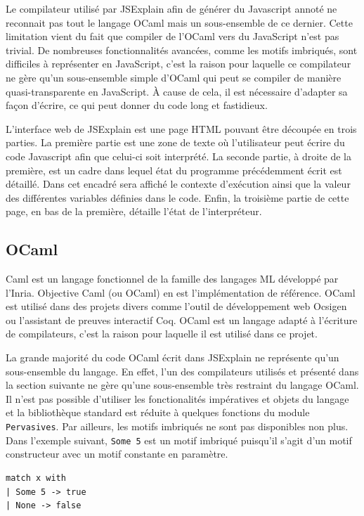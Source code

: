 \documentclass{easychair}
\begin{document}
Le compilateur utilisé par JSExplain afin de générer du Javascript annoté ne 
reconnait pas tout le langage OCaml mais un sous-ensemble de ce dernier. Cette 
limitation vient du fait que compiler de l'OCaml vers du JavaScript n'est pas 
trivial. De nombreuses fonctionnalités avancées, comme les motifs imbriqués, 
sont difficiles à représenter en JavaScript, c'est la raison pour laquelle ce 
compilateur ne gère qu'un sous-ensemble simple d'OCaml qui peut se compiler de 
manière quasi-transparente en JavaScript. À cause de cela, il est nécessaire 
d'adapter sa façon d'écrire, ce qui peut donner du code long et fastidieux.

L'interface web de JSExplain est une page HTML pouvant être découpée en trois
parties. La première partie est une zone de texte où l'utilisateur peut écrire
du code Javascript afin que celui-ci soit interprété. La seconde partie, à
droite de la première, est un cadre dans lequel état du programme précédemment
écrit est détaillé. Dans cet encadré sera affiché le contexte d'exécution ainsi
que la valeur des différentes variables définies dans le code. Enfin, la
troisième partie de cette page, en bas de la première, détaille l'état de
l'interpréteur.

\subsection{OCaml}
Caml est un langage fonctionnel de la famille des langages ML développé par 
l'Inria. Objective Caml (ou OCaml) en est l'implémentation de référence. OCaml 
est utilisé dans des projets divers comme l'outil de développement web Ocsigen 
ou l'assistant de preuves interactif Coq. OCaml est un langage adapté à 
l'écriture de compilateurs, c'est la raison pour laquelle il est utilisé dans ce 
projet.

La grande majorité du code OCaml écrit dans JSExplain ne représente qu'un 
sous-ensemble du langage. En effet, l'un des compilateurs utilisés et présenté 
dans la section suivante ne gère qu'une sous-ensemble très restraint du langage 
OCaml. Il n'est pas possible d'utiliser les fonctionalités impératives et 
objets du langage et la bibliothèque standard est réduite à quelques fonctions 
du module \verb|Pervasives|. Par ailleurs, les motifs imbriqués ne sont pas 
disponibles non plus. Dans l'exemple suivant, \verb|Some 5| est un motif 
imbriqué puisqu'il s'agit d'un motif constructeur avec un motif constante en 
paramètre.

\begin{verbatim}
match x with
| Some 5 -> true
| None -> false
\end{verbatim}
\end{document}
